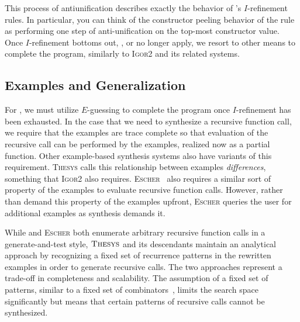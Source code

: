 This process of antiunification describes exactly the behavior of \mlsyn{}'s $I$-refinement rules.
In particular, you can think of the constructor peeling behavior of the  rule as performing one step of anti-unification on the top-most constructor value.
Once $I$-refinement bottoms out, \ie,  or  no longer apply, we resort to other means to complete the program, similarly to \textsc{Igor2} and its related systems.

\subsection{Examples and Generalization}

For \mlsyn{}, we must utilize $E$-guessing to complete the program once $I$-refinement has been exhausted.
In the case that we need to synthesize a recursive function call, we require that the examples are trace complete so that evaluation of the recursive call can be performed by the examples, realized now as a partial function.
Other example-based synthesis systems also have variants of this requirement.
\textsc{Thesys} calls this relationship between examples \emph{differences}, something that \textsc{Igor2} also requires.
\textsc{Escher}~\citep{albarghouthi-cav-2013} also requires a similar sort of property of the examples to evaluate recursive function calls.
However, rather than demand this property of the examples upfront, \textsc{Escher} queries the user for additional examples as synthesis demands it.

While \mlsyn{} and \textsc{Escher} both enumerate arbitrary recursive function calls in a generate-and-test style, $\textsc{Thesys}$ and its descendants maintain an analytical approach by recognizing a fixed set of recurrence patterns in the rewritten examples in order to generate recursive calls.
The two approaches represent a trade-off in completeness and scalability.
The assumption of a fixed set of patterns, similar to a fixed set of combinators~\citep{feser-pldi-2015}, limits the search space significantly but means that certain patterns of recursive calls cannot be synthesized.
